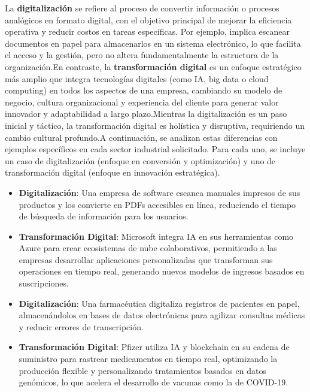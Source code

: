 La \textbf{digitalización} se refiere al proceso de convertir información o procesos analógicos en formato digital, con el objetivo principal de mejorar la eficiencia operativa y reducir costos en tareas específicas. Por ejemplo, implica escanear documentos en papel para almacenarlos en un sistema electrónico, lo que facilita el acceso y la gestión, pero no altera fundamentalmente la estructura de la organización.En contraste, la \textbf{transformación digital} es un enfoque estratégico más amplio que integra tecnologías digitales (como IA, big data o cloud computing) en todos los aspectos de una empresa, cambiando su modelo de negocio, cultura organizacional y experiencia del cliente para generar valor innovador y adaptabilidad a largo plazo.Mientras la digitalización es un paso inicial y táctico, la transformación digital es holística y disruptiva, requiriendo un cambio cultural profundo.A continuación, se analizan estas diferencias con ejemplos específicos en cada sector industrial solicitado. Para cada uno, se incluye un caso de digitalización (enfoque en conversión y optimización) y uno de transformación digital (enfoque en innovación estratégica).

\begin{itemize}
\item \textbf{Digitalización}: Una empresa de software escanea manuales impresos de sus productos y los convierte en PDFs accesibles en línea, reduciendo el tiempo de búsqueda de información para los usuarios.\item \textbf{Transformación Digital}: Microsoft integra IA en sus herramientas como Azure para crear ecosistemas de nube colaborativos, permitiendo a las empresas desarrollar aplicaciones personalizadas que transforman sus operaciones en tiempo real, generando nuevos modelos de ingresos basados en suscripciones.
\end{itemize}

\begin{itemize}
\item \textbf{Digitalización}: Una farmacéutica digitaliza registros de pacientes en papel, almacenándolos en bases de datos electrónicas para agilizar consultas médicas y reducir errores de transcripción.
\item \textbf{Transformación Digital}: Pfizer utiliza IA y blockchain en su cadena de suministro para rastrear medicamentos en tiempo real, optimizando la producción flexible y personalizando tratamientos basados en datos genómicos, lo que acelera el desarrollo de vacunas como la de COVID-19.
\end{itemize}

